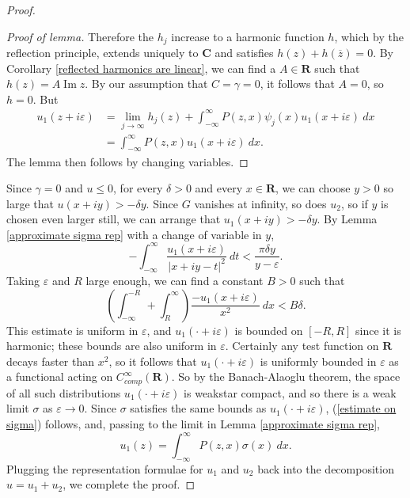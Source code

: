 \documentclass[12pt]{report}
\newcommand{\RR}{\mathbf{R}}
\newcommand{\CC}{\mathbf{C}}
\renewcommand{\Im}{\operatorname{Im}}
\theoremstyle{definition}
\begin{document}
\begin{proof}
\begin{proof}[Proof of lemma]
    Therefore the $h_j$ increase to a harmonic function $h$, which by the reflection principle, extends uniquely to $\CC$ and satisfies $h(z) + h(\overline z) = 0$. By Corollary \ref{reflected harmonics are linear}, we can find a $A \in \RR$ such that $h(z) = A\Im z$. By our assumption that $C = \gamma = 0$, it follows that $A = 0$, so $h = 0$. But
  \begin{align*}u_1(z + i\varepsilon) &= \lim_{j \to \infty} h_j(z) + \int_{-\infty}^\infty P(z, x)\psi_j(x)u_1(x + i\varepsilon)~dx \\
  &= \int_{-\infty}^\infty P(z, x)u_1(x + i\varepsilon) ~dx.\end{align*}
    The lemma then follows by changing variables.
\end{proof}
    Since $\gamma = 0$ and $u \leq 0$, for every $\delta > 0$ and every $x \in \RR$, we can choose $y > 0$ so large that $u(x + iy) > -\delta y$. Since $G$ vanishes at infinity, so does $u_2$, so if $y$ is chosen even larger still, we can arrange that $u_1(x + iy) > -\delta y$. By Lemma \ref{approximate sigma rep} with a change of variable in $y$,
$$-\int_{-\infty}^\infty \frac{u_1(x + i\varepsilon)}{|x + iy - t|^2} ~dt < \frac{\pi \delta y}{y - \varepsilon}.$$
    Taking $\varepsilon$ and $R$ large enough, we can find a constant $B > 0$ such that
$$\left(\int_{-\infty}^{-R} + \int_R^\infty\right) \frac{-u_1(x + i\varepsilon)}{x^2} ~dx < B \delta.$$
    This estimate is uniform in $\varepsilon$, and $u_1(\cdot + i\varepsilon)$ is bounded on $[-R, R]$ since it is harmonic; these bounds are also uniform in $\varepsilon$. Certainly any test function on $\RR$ decays faster than $x^2$, so it follows that $u_1(\cdot + i\varepsilon)$ is uniformly bounded in $\varepsilon$ as a functional acting on $C^\infty_{comp}(\RR)$. So by the Banach-Alaoglu theorem, the space of all such distributions $u_1(\cdot + i\varepsilon)$ is weakstar compact, and so there is a weak limit $\sigma$ as $\varepsilon \to 0$. Since $\sigma$ satisfies the same bounds as $u_1(\cdot + i\varepsilon)$, (\ref{estimate on sigma}) follows, and, passing to the limit in Lemma \ref{approximate sigma rep},
$$u_1(z) = \int_{-\infty}^\infty P(z, x) \sigma(x) ~dx.$$
    Plugging the representation formulae for $u_1$ and $u_2$ back into the decomposition $u = u_1 + u_2$, we complete the proof.
\end{proof}
\end{document}
